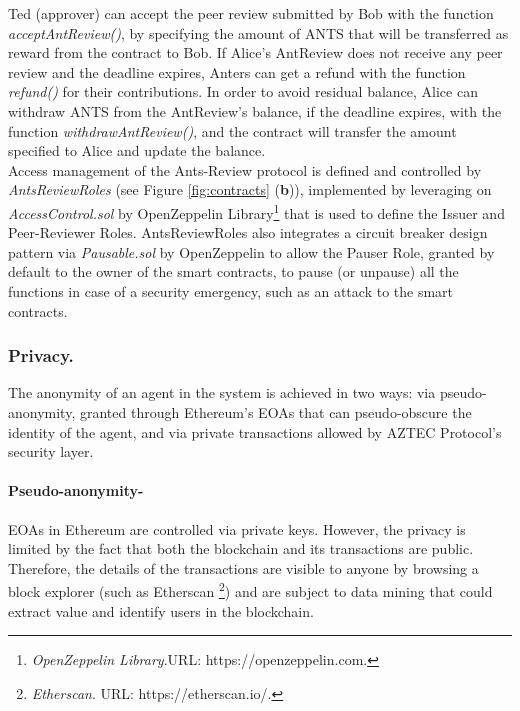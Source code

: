 \documentclass[runningheads]{llncs}
\begin{document}
Ted (approver) can accept the peer review submitted by Bob with the function \emph{acceptAntReview()}, by specifying the amount of ANTS that will be transferred as reward from the contract to Bob.
If Alice's AntReview does not receive any peer review and the deadline expires, Anters can get a refund with the function \emph{refund()} for their contributions. In order to avoid residual balance, Alice can withdraw ANTS from the AntReview's balance, if the deadline expires, with the function \emph{withdrawAntReview()}, and the contract will transfer the amount specified to Alice and update the balance.
\\
Access management of the Ants-Review protocol is defined and controlled by \emph{AntsReviewRoles} (see Figure \ref{fig:contracts} (\textbf{b})), implemented by leveraging on \emph{AccessControl.sol} by OpenZeppelin Library\footnote[10]{\emph{OpenZeppelin Library}.\textsc{URL:} https://openzeppelin.com.} that is used to define the Issuer and Peer-Reviewer Roles. AntsReviewRoles also integrates a circuit breaker design pattern via \emph{Pausable.sol} by OpenZeppelin to allow the Pauser Role, granted by default to the owner of the smart contracts, to pause (or unpause) all the functions in case of a security emergency, such as an attack to the smart contracts.

\subsubsection{Privacy.}
The anonymity of an agent in the system is achieved in two ways: via pseudo-anonymity, granted through Ethereum's EOAs that can pseudo-obscure the identity of the agent, and via private transactions allowed by AZTEC\cite{AZTEC} Protocol's security layer.

\paragraph{\textbf{Pseudo-anonymity}-}EOAs in Ethereum are controlled via private keys. However, the privacy is limited by the fact that both the blockchain and its transactions are public.  Therefore, the details of the transactions are visible to anyone by browsing a block explorer (such as Etherscan \footnote[11]{\emph{Etherscan}. \textsc{URL:} https://etherscan.io/.}) and are subject to data mining that could extract value and identify users in the blockchain.
\end{document}
